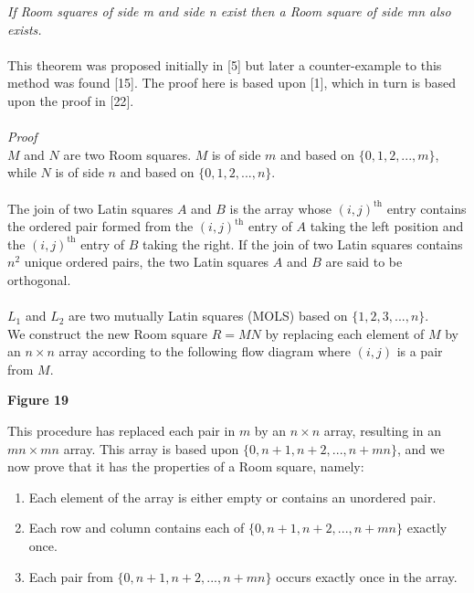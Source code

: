 \documentclass[
  12pt,
  a4paper]{book}
\begin{document}
\emph{If Room squares of side m and side n exist then a Room square of
side mn also exists.}\\
~\\
This theorem was proposed initially in {[}5{]} but later a
counter-example to this method was found {[}15{]}. The proof here is
based upon {[}1{]}, which in turn is based upon the proof in {[}22{]}.\\
~\\
\emph{Proof}\\
\(M\) and \(N\) are two Room squares. \(M\) is of side \(m\) and based
on \(\{0,1,2,...,m\}\), while \(N\) is of side \(n\) and based on
\(\{0,1,2,...,n\}\).\\
~\\
The join of two Latin squares \(A\) and \(B\) is the array whose
\((i,j)^{\mathrm{th}}\) entry contains the ordered pair formed from the
\((i,j)^{\mathrm{th}}\) entry of \(A\) taking the left position and the
\((i,j)^{\mathrm{th}}\) entry of \(B\) taking the right. If the join of
two Latin squares contains \(n^2\) unique ordered pairs, the two Latin
squares \(A\) and \(B\) are said to be orthogonal.\\
~\\
\(L_1\) and \(L_2\) are two mutually Latin squares (MOLS) based on
\(\{1,2,3,...,n\}\).\\
We construct the new Room square \(R=MN\) by replacing each element of
\(M\) by an \(n \times n\) array according to the following flow diagram
where \((i,j)\) is a pair from \(M\).

\textbf{Figure 19}

This procedure has replaced each pair in \(m\) by an \(n \times n\)
array, resulting in an \(mn \times mn\) array. This array is based upon
\(\{0,n+1,n+2,...,n+mn\}\), and we now prove that it has the properties
of a Room square, namely:

\begin{enumerate}
\def\labelenumi{\arabic{enumi}.}
\item
  Each element of the array is either empty or contains an unordered
  pair.
\item
  Each row and column contains each of \(\{0,n+1,n+2,...,n+mn\}\)
  exactly once.
\item
  Each pair from \(\{0,n+1,n+2,...,n+mn\}\) occurs exactly once in the
  array.
\end{enumerate}
\end{document}
